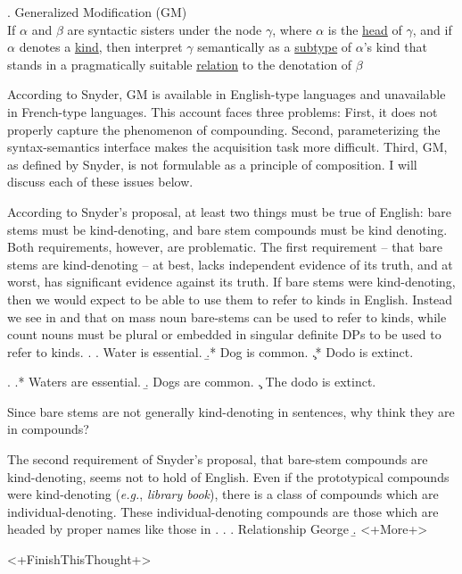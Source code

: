 \documentclass[MilwayThesis]{subfiles}
\begin{document}
\ex. Generalized Modification (GM)\\
If $\alpha$ and $\beta$ are syntactic sisters under the node $\gamma$, where $\alpha$ is the \uline{head} of $\gamma$, and if $\alpha$ denotes a \uline{kind}, then interpret $\gamma$ semantically as a \uline{subtype} of $\alpha$'s kind that stands in a pragmatically suitable \uline{relation} to the denotation of $\beta$

According to Snyder, GM is available in English-type languages and unavailable in French-type languages.
This account faces three problems:
First, it does not properly capture the phenomenon of compounding.
Second, parameterizing the syntax-semantics interface makes the acquisition task more difficult.
Third, GM, as defined by Snyder, is not formulable as a principle of composition.
I will discuss each of these issues below.

According to Snyder's proposal, at least two things must be true of English: bare stems must be kind-denoting, and bare stem compounds must be kind denoting.
Both requirements, however, are problematic.
The first requirement -- that bare stems are kind-denoting -- at best, lacks independent evidence of its truth, and at worst, has significant evidence against its truth.
If bare stems were kind-denoting, then we would expect to be able to use them to refer to kinds in English.
Instead we see in \Next and \NNext that on mass noun bare-stems can be used to refer to kinds, while count nouns must be plural or embedded in singular definite DPs to be used to refer to kinds.
\ex.
\a. Water is essential.
\b.* Dog is common.
\c.* Dodo is extinct.

\ex.
\a.* Waters are essential.
\b. Dogs are common.
\c. The dodo is extinct.\\

Since bare stems are not generally kind-denoting in sentences, why think they are in compounds?

The second requirement of Snyder's proposal, that bare-stem compounds are kind-denoting, seems not to hold of English.
Even if the prototypical compounds were kind-denoting (\textit{e.g.}, \textit{library book}), there is a class of compounds which are individual-denoting.
These individual-denoting compounds are those which are headed by proper names like those in \Next.
\ex.
\a. Relationship George
\b. <+More+>

<+FinishThisThought+>
\end{document}
